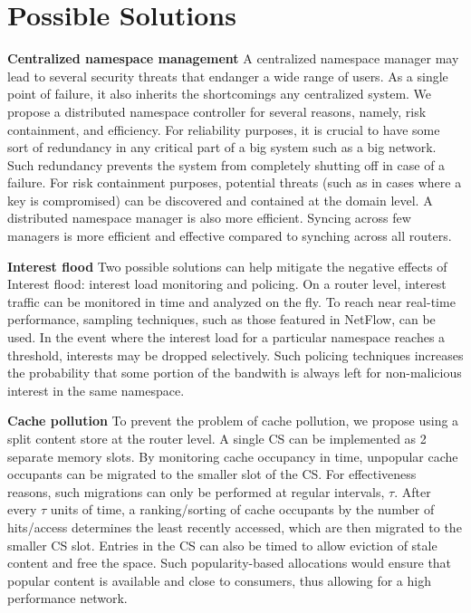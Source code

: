\documentclass[conference,compsoc]{IEEEtran}
\begin{document}
\section{Possible Solutions}
\label{Possible Solutions}
\textbf{Centralized namespace management} A centralized namespace manager may lead to several security threats that endanger a wide range of users. As a single point of failure, it also inherits the shortcomings any centralized system. We propose a distributed namespace controller for several reasons, namely, risk containment, and efficiency. For reliability purposes, it is crucial to have some sort of redundancy in any critical part of a big system such as a big network. Such redundancy prevents the system from completely shutting off in case of a failure. For risk containment purposes, potential threats (such as in cases where a key is compromised) can be discovered and contained at the domain level. A distributed namespace manager is also more efficient. Syncing across few managers is more efficient and effective compared to synching across all routers.

\textbf{Interest flood} Two possible solutions can help mitigate the negative effects of Interest flood: interest load monitoring and policing. On a router level, interest traffic can be monitored in time and analyzed on the fly. To reach near real-time performance, sampling techniques, such as those featured in NetFlow, can be used. In the event where the interest load for a particular namespace reaches a threshold, interests may be dropped selectively. Such policing techniques increases the probability that some portion of the bandwith is always left for non-malicious interest in the same namespace.

\textbf{Cache pollution}
To prevent the problem of cache pollution, we propose using a split content store at the router level. A single CS can be implemented as 2 separate memory slots. By monitoring cache occupancy in time, unpopular cache occupants can be migrated to the smaller slot of the CS. For effectiveness reasons, such migrations can only be performed at regular intervals, $\tau$. After every $\tau$ units of time, a ranking/sorting of cache occupants by the number of hits/access determines the least recently accessed, which are then migrated to the smaller CS slot. Entries in the CS can also be timed to allow eviction of stale content and free the space. Such popularity-based allocations would ensure that popular content is available and close to consumers, thus allowing for a high performance network.
\end{document}
